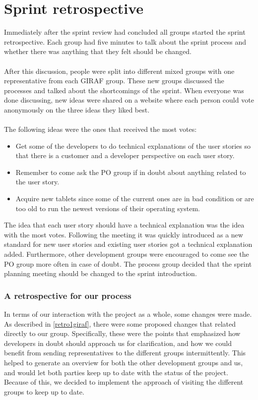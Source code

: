 \section{Sprint retrospective}\label{sprint-1-retrospective}\label{retro1giraf}
Immediately after the sprint review had concluded all groups started the sprint retrospective.
Each group had five minutes to talk about the sprint process and whether there was anything that they felt should be changed.
\\\\
After this discussion, people were split into different mixed groups with one representative from each GIRAF group.
These new groups discussed the processes and talked about the shortcomings of the sprint.
When everyone was done discussing, new ideas were shared on a website where each person could vote anonymously on the three ideas they liked best.
\\\\
The following ideas were the ones that received the most votes:
\begin{itemize}
    \item Get some of the developers to do technical explanations of the user stories so that there is a customer and a developer perspective on each user story.
    \item Remember to come ask the PO group if in doubt about anything related to the user story.
    \item Acquire new tablets since some of the current ones are in bad condition or are too old to run the newest versions of their operating system.
\end{itemize}
The idea that each user story should have a technical explanation was the idea with the most votes. 
Following the meeting it was quickly introduced as a new standard for new user stories and existing user stories got a technical explanation added.
Furthermore, other development groups were encouraged to come see the PO group more often in case of doubt.
The process group decided that the sprint planning meeting should be changed to the sprint introduction.

\subsubsection{A retrospective for our process}
In terms of our interaction with the project as a whole, some changes were made.
As described in \autoref{retro1giraf}, there were some proposed changes that related directly to our group.
Specifically, these were the points that emphasized how developers in doubt should approach us for clarification, and how we could benefit from sending representatives to the different groups intermittently. 
This helped to generate an overview for both the other development groups and us, and would let both parties keep up to date with the status of the project.
Because of this, we decided to implement the approach of visiting the different groups to keep up to date.

